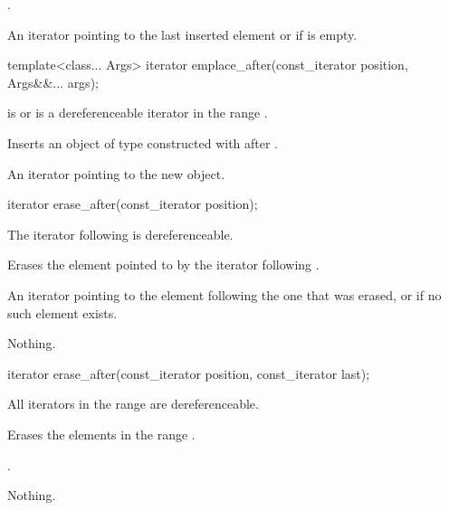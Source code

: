 \begin{itemdescr}
\pnum
\effects
{}.

\pnum
\returns
An iterator pointing to the last inserted element or  if  is empty.
\end{itemdescr}


%
\begin{itemdecl}
template<class... Args>
  iterator emplace_after(const_iterator position, Args&&... args);
\end{itemdecl}

\begin{itemdescr}
\pnum
\expects
{} is  or is a dereferenceable
iterator in the range .

\pnum
\effects
Inserts an object of type  constructed with
 after .

\pnum
\returns
An iterator pointing to the new object.
\end{itemdescr}

%
\begin{itemdecl}
iterator erase_after(const_iterator position);
\end{itemdecl}

\begin{itemdescr}
\pnum
\expects
The iterator following  is dereferenceable.

\pnum
\effects
Erases the element pointed to by the iterator following .

\pnum
\returns
An iterator pointing to the element following the one that was
erased, or  if no such element exists.

\pnum
\throws
Nothing.
\end{itemdescr}

\begin{itemdecl}
iterator erase_after(const_iterator position, const_iterator last);
\end{itemdecl}

\begin{itemdescr}
\pnum
\expects
All iterators in the range  are dereferenceable.

\pnum
\effects
Erases the elements in the range .

\pnum
\returns
{}.

\pnum
\throws
Nothing.
\end{itemdescr}


